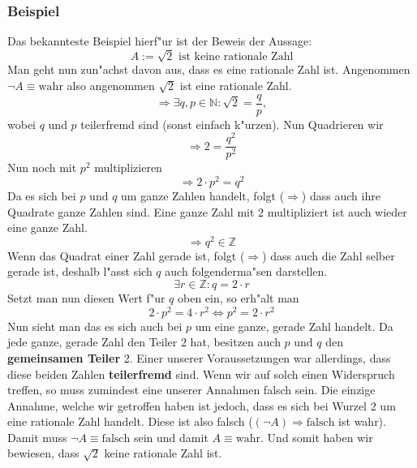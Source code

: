 \subsubsection{Beispiel}
Das bekannteste Beispiel hierf"ur ist der Beweis der Aussage:
\begin{equation*}
A:=  \sqrt{2} \text{ ist keine rationale Zahl}
\end{equation*}
Man geht nun zun"achst davon aus, dass es eine rationale Zahl ist. Angenommen $\neg A \equiv \text{wahr}$ also angenommen $\sqrt{2}$ ist eine rationale Zahl.
\begin{equation*}
\Rightarrow \exists q, p \in \mathbb{N}:\sqrt{2}=\frac{q}{p},
\end{equation*}
wobei $q$ und $p$ teilerfremd sind (sonst einfach k"urzen). Nun Quadrieren wir
\begin{equation*}
\Rightarrow 2 = \frac{q^2}{p^2}
\end{equation*}
Nun noch mit $p^2$ multiplizieren
\begin{equation*}
\Rightarrow 2 \cdot p^2 = q^2
\end{equation*}
Da es sich bei $p$ und $q$ um ganze Zahlen handelt, folgt ($\Rightarrow$) dass auch ihre Quadrate ganze Zahlen sind. Eine ganze Zahl mit $2$ multipliziert ist auch wieder eine ganze Zahl. 
\begin{equation*}
\Rightarrow q^2 \in \mathbb{Z}
\end{equation*}
Wenn das Quadrat einer Zahl gerade ist, folgt ($\Rightarrow$) dass auch die Zahl selber gerade ist, deshalb l"asst sich $q$ auch folgenderma"sen darstellen.
\begin{equation*}
\exists r \in \mathbb{Z} : q = 2 \cdot r
\end{equation*}
Setzt man nun diesen Wert f"ur $q$ oben ein, so erh"alt man
\begin{equation*}
2 \cdot p^2 = 4 \cdot r^2 \iff p^2 = 2 \cdot r^2
\end{equation*}
Nun sieht man das es sich auch bei $p$ um eine ganze, gerade Zahl handelt. Da jede ganze, gerade Zahl den Teiler $2$ hat, besitzen auch $p$ und $q$ den \textbf{gemeinsamen Teiler} 2. Einer unserer Voraussetzungen war allerdings, dass diese beiden Zahlen \textbf{teilerfremd} sind. Wenn wir auf solch einen Widerspruch treffen, so muss zumindest eine unserer Annahmen falsch sein. Die einzige Annahme, welche wir getroffen haben ist jedoch, dass es sich bei Wurzel $2$ um eine rationale Zahl handelt. Diese ist also falsch ($(\neg A) \Rightarrow \text{falsch}$ ist wahr). Damit muss $\neg A \equiv \text{falsch}$ sein und damit $A \equiv \text{wahr}$. Und somit haben wir bewiesen, dass $\sqrt{2}$ keine rationale Zahl ist.


